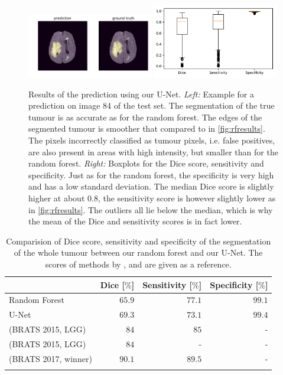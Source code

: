 \documentclass[final]{article}
\begin{document}
\begin{figure}[h]
\centering
\includegraphics[width=0.49\textwidth]{test_Flair_84}
\includegraphics[width=0.49\textwidth]{boxplots}
\caption{Results of the prediction using our U-Net. \textit{Left:} Example for a prediction on image 84 of the test set.
The segmentation of the true tumour is as accurate as for the random forest. The edges of the segmented tumour is smoother that compared to in \cref{fig:rfresults}. The pixels incorrectly classified as tumour pixels, i.e. false positives, are also present in areas with high intensity, but smaller than for the random forest. \textit{Right:} Boxplots for the
Dice score, sensitivity and specificity. Just as for the random forest, the specificity is very high and has a low standard deviation. The median Dice score is slightly higher at about 0.8, the sensitivity score is however slightly lower as in \cref{fig:rfresults}. The outliers all lie below the median, which is why the mean of the Dice and sensitivity scores is in fact lower.}
\label{fig:uresults}
\end{figure}

\begin{table}[h]
\centering
\begin{tabular}{lrrr}

	\toprule
	 & Dice [$\%$] & Sensitivity [$\%$] & Specificity [$\%$] \\
	\midrule
	Random Forest & $65.9$ & $77.1$ & $99.1$ \\
	U-Net & $69.3$ & $73.1$ & $99.4$ \\
	\citeauthor{maier2015} (BRATS 2015, LGG)& $84$ & $85$ & - \\
	\citeauthor{dong2017} (BRATS 2015, LGG) & $84$ & - & - \\
	\citeauthor{brats2017short} (BRATS 2017, winner) & $90.1$ & $89.5$ & - \\
	\bottomrule \\
	
\end{tabular}
\caption{Comparision of Dice score, sensitivity and specificity of the segmentation of the whole tumour between our random forest and our U-Net. The scores of methods by \cite{maier2015}, \cite{dong2017} and \cite{brats2017short} are given as a reference.}  \label{tab:scores}
\end{table}
\end{document}
